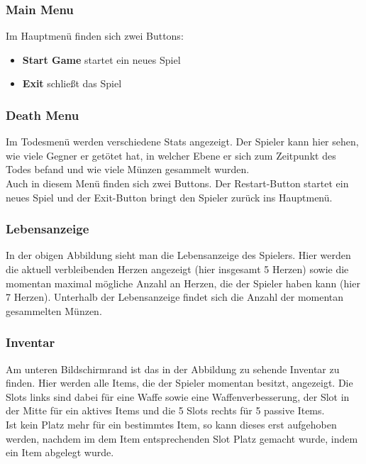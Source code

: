 \subsubsection{Main Menu}
Im Hauptmenü finden sich zwei Buttons:
\begin{itemize}
\item \textbf{Start Game} startet ein neues Spiel
\item \textbf{Exit} schließt das Spiel
\end{itemize}

\subsubsection{Death Menu}
Im Todesmenü werden verschiedene Stats angezeigt. Der Spieler kann hier sehen, wie viele Gegner er getötet hat, in welcher Ebene er sich zum Zeitpunkt des Todes befand und wie viele Münzen gesammelt wurden.\\
Auch in diesem Menü finden sich zwei Buttons. Der Restart-Button startet ein neues Spiel und der Exit-Button bringt den Spieler zurück ins Hauptmenü.

\subsubsection{Lebensanzeige}
In der obigen Abbildung sieht man die Lebensanzeige des Spielers. Hier werden die aktuell verbleibenden Herzen angezeigt (hier insgesamt 5 Herzen) sowie die momentan maximal mögliche Anzahl an Herzen, die der Spieler haben kann (hier 7 Herzen). Unterhalb der Lebensanzeige findet sich die Anzahl der momentan gesammelten Münzen.

\subsubsection{Inventar}
Am unteren Bildschirmrand ist das in der Abbildung zu sehende Inventar zu finden. Hier werden alle Items, die der Spieler momentan besitzt, angezeigt. Die Slots links sind dabei für eine Waffe sowie eine Waffenverbesserung, der Slot in der Mitte für ein aktives Items und die 5 Slots rechts für 5 passive Items. \\
Ist kein Platz mehr für ein bestimmtes Item, so kann dieses erst aufgehoben werden, nachdem im dem Item entsprechenden Slot Platz gemacht wurde, indem ein Item abgelegt wurde.

